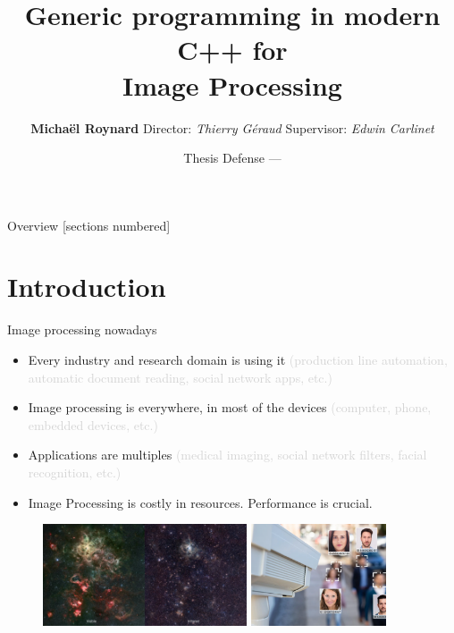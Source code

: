 \documentclass[12pt,aspectratio=169]{beamer}
\title{Generic programming in modern C++ for\\ Image Processing}
\date{Thesis Defense --- \displaydate{dateSoutenance}}
\author{\textbf{Michaël Roynard} \hspace{1cm} Director: \emph{Thierry Géraud} \hspace{1cm} Supervisor: \emph{Edwin Carlinet}}
\institute{EPITA Research Laboratory (LRE) --- Le Kremlin-Bicêtre, France}
\newcommand{\GRAYOUT}[1]{\textcolor{lightgray}{#1}}%
\begin{document}
\maketitle

\begin{frame}{Overview}
  [sections numbered]
  \tableofcontents[hideallsubsections]
\end{frame}

%
%
%

\section[Introduction]{Introduction}

\begin{frame}[fragile]{Image processing nowadays}
  \begin{itemize}
    \item Every industry and research domain is using it \GRAYOUT{(production line automation, automatic document
            reading, social network apps, etc.)}
    \item Image processing is everywhere, in most of the devices \GRAYOUT{(computer, phone, embedded devices, etc.)}
    \item Applications are multiples \GRAYOUT{(medical imaging, social network filters, facial recognition, etc.)}
    \item Image Processing is costly in resources. Performance is crucial.
  \end{itemize}
  \begin{figure}[bl]
    \hfill
    \includegraphics[height=3cm]{../illustrations/rgb_infrared}
    \hfill
    \includegraphics[height=3cm]{../illustrations/camera}
    \hspace{1cm}
  \end{figure}
\end{frame}
\end{document}
